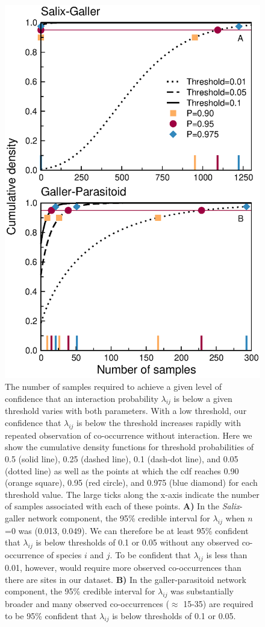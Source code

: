 \documentclass[12pt]{article}
\begin{document}
  \begin{figure}[h!]
    \caption{The number of samples required to achieve a given level of confidence that an interaction probability $\lambda_{ij}$ is below a given threshold varies with both parameters. With a low threshold, our confidence that $\lambda_{ij}$ is below the threshold increases rapidly with repeated observation of co-occurrence without interaction. Here we show the cumulative density functions for threshold probabilities of 0.5 (solid line), 0.25 (dashed line), 0.1 (dash-dot line), and 0.05 (dotted line) as well as the points at which the cdf reaches 0.90 (orange square), 0.95 (red circle), and 0.975 (blue diamond) for each threshold value. The large ticks along the x-axis indicate the number of samples associated with each of these points. \textbf{A)} In the \emph{Salix}-galler network component, the 95\% credible interval for $\lambda_{ij}$ when $n$=0 was (0.013, 0.049). We can therefore be at least 95\% confident that $\lambda_{ij}$ is below thresholds of 0.1 or 0.05 without any observed co-occurrence of species $i$ and $j$. To be confident that $\lambda_{ij}$ is less than 0.01, however, would require more observed co-occurrences than there are sites in our dataset. \textbf{B)} In the galler-parasitoid network component, the 95\% credible interval for $\lambda_{ij}$ was substantially broader and many observed co-occurrences ($\approx$ 15-35) are required to be 95\% confident that $\lambda_{ij}$ is below thresholds of 0.1 or 0.05.}
    \label{Salix_cdfs}
    \begin{center}
    \includegraphics[width=.5\textwidth]{figures/Salix_Galler_samples_and_cdfs_Zillis.eps}
    \end{center}

    \end{figure}
\end{document}
